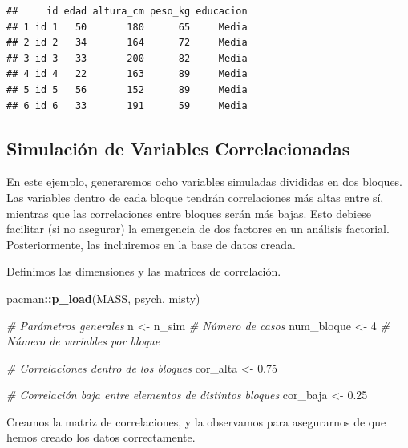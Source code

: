 \documentclass[
]{book}
\newenvironment{Shaded}{\begin{snugshade}}{\end{snugshade}}
\newcommand{\CommentTok}[1]{\textcolor[rgb]{0.56,0.35,0.01}{\textit{#1}}}
\newcommand{\DecValTok}[1]{\textcolor[rgb]{0.00,0.00,0.81}{#1}}
\newcommand{\FloatTok}[1]{\textcolor[rgb]{0.00,0.00,0.81}{#1}}
\newcommand{\FunctionTok}[1]{\textcolor[rgb]{0.13,0.29,0.53}{\textbf{#1}}}
\newcommand{\NormalTok}[1]{#1}
\newcommand{\OtherTok}[1]{\textcolor[rgb]{0.56,0.35,0.01}{#1}}
\newcommand{\SpecialCharTok}[1]{\textcolor[rgb]{0.81,0.36,0.00}{\textbf{#1}}}
\begin{document}
\begin{verbatim}
##     id edad altura_cm peso_kg educacion
## 1 id 1   50       180      65     Media
## 2 id 2   34       164      72     Media
## 3 id 3   33       200      82     Media
## 4 id 4   22       163      89     Media
## 5 id 5   56       152      89     Media
## 6 id 6   33       191      59     Media
\end{verbatim}

\subsection{Simulación de Variables Correlacionadas}\label{simulaciuxf3n-de-variables-correlacionadas}

En este ejemplo, generaremos ocho variables simuladas divididas en dos bloques. Las variables dentro de cada bloque tendrán correlaciones más altas entre sí, mientras que las correlaciones entre bloques serán más bajas. Esto debiese facilitar (si no asegurar) la emergencia de dos factores en un análisis factorial. Posteriormente, las incluiremos en la base de datos creada.

Definimos las dimensiones y las matrices de correlación.

\begin{Shaded}
\begin{Highlighting}[]
\NormalTok{pacman}\SpecialCharTok{::}\FunctionTok{p\_load}\NormalTok{(MASS, psych, misty)}

\CommentTok{\# Parámetros generales}
\NormalTok{n }\OtherTok{\textless{}{-}}\NormalTok{ n\_sim  }\CommentTok{\# Número de casos}
\NormalTok{num\_bloque }\OtherTok{\textless{}{-}} \DecValTok{4}  \CommentTok{\# Número de variables por bloque}

\CommentTok{\# Correlaciones dentro de los bloques}
\NormalTok{cor\_alta }\OtherTok{\textless{}{-}} \FloatTok{0.75}

\CommentTok{\# Correlación baja entre elementos de distintos bloques}
\NormalTok{cor\_baja }\OtherTok{\textless{}{-}} \FloatTok{0.25}
\end{Highlighting}
\end{Shaded}

Creamos la matriz de correlaciones, y la observamos para asegurarnos de que hemos creado los datos correctamente.
\end{document}
